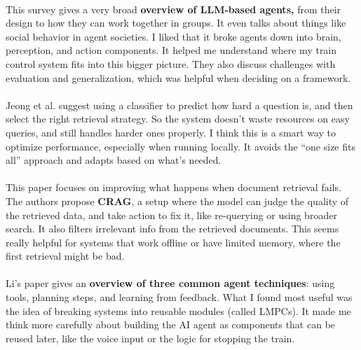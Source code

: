 \paragraph{\cite{xi_rise_2023}}
This survey gives a very broad \textbf{overview of LLM-based agents,} from their design to how they can work together in groups. It even talks about things like social behavior in agent societies. I liked that it broke agents down into brain, perception, and action components. It helped me understand where my train control system fits into this bigger picture. They also discuss challenges with evaluation and generalization, which was helpful when deciding on a framework.

\paragraph{\cite{jeong_adaptive-rag_2024}}
Jeong et al. suggest using a classifier to predict how hard a question is, and then select the right retrieval strategy. So the system doesn't waste resources on easy queries, and still handles harder ones properly. I think this is a smart way to optimize performance, especially when running locally. It avoids the “one size fits all” approach and adapts based on what’s needed.

\paragraph{\cite{noauthor_corrective_nodate}}
This paper focuses on improving what happens when document retrieval fails. The authors propose \textbf{CRAG}, a setup where the model can judge the quality of the retrieved data, and take action to fix it, like re-querying or using broader search. It also filters irrelevant info from the retrieved documents. This seems really helpful for systems that work offline or have limited memory, where the first retrieval might be bad.

\paragraph{\cite{li_review_2024}}
Li's paper gives an \textbf{overview of three common agent techniques}: using tools, planning steps, and learning from feedback. What I found most useful was the idea of breaking systems into reusable modules (called LMPCs). It made me think more carefully about building the AI agent as components that can be reused later, like the voice input or the logic for stopping the train.

